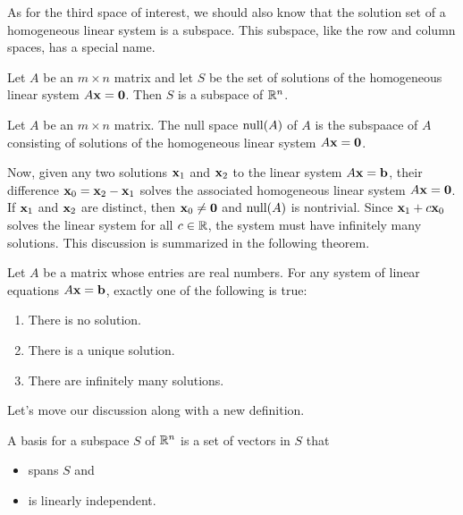 \documentclass[../m073main.tex]{subfiles}
\begin{document}
As for the third space of interest, we should also know that the solution set of a homogeneous linear system is a subspace.
This subspace, like the row and column spaces, has a special name.

\begin{theorem}
	Let $A$ be an $m\times n$ matrix and let $S$ be the set of solutions of the homogeneous linear system $A\mathbf{x} = \mathbf{0}$.
	Then $S$ is a subspace of $\mathbb{R}^n$.
\end{theorem}

\begin{definition}
	Let $A$ be an $m\times n$ matrix.
	The null space $\textrm{null}(A)$ of $A$ is the subspaace of $A$ consisting of solutions of the homogeneous linear system $A\mathbf{x} = \mathbf{0}$.
\end{definition}

Now, given any two solutions $\mathbf{x}_1$ and $\mathbf{x}_2$ to the linear system $A\mathbf{x} = \mathbf{b}$, their difference $\mathbf{x}_0 = \mathbf{x}_2 - \mathbf{x}_1$ solves the associated homogeneous linear system $A\mathbf{x} = \mathbf{0}$.
If $\mathbf{x}_1$ and $\mathbf{x}_2$ are distinct, then $\mathbf{x}_0 \neq \mathbf{0}$ and $\textrm{null} (A)$ is nontrivial.
Since $\mathbf{x}_1 + c\mathbf{x}_0$ solves the linear system for all $c \in \mathbb{R}$, the system must have infinitely many solutions.
This discussion is summarized in the following theorem.

\begin{theorem}
	Let $A$ be a matrix whose entries are real numbers.
	For any system of linear equations $A\mathbf{x} = \mathbf{b}$, exactly one of the following is true:
	\begin{enumerate}[label=(\alph*)]
		\item There is no solution.
		\item There is a unique solution.
		\item There are infinitely many solutions.
	\end{enumerate}
\end{theorem}

Let's move our discussion along with a new definition.

\begin{definition}
	A basis for a subspace $S$ of $\mathbb{R}^n$ is a set of vectors in $S$ that
	\begin{itemize}
		\item spans $S$ and
		\item is linearly independent.
	\end{itemize}
\end{definition}
\end{document}
